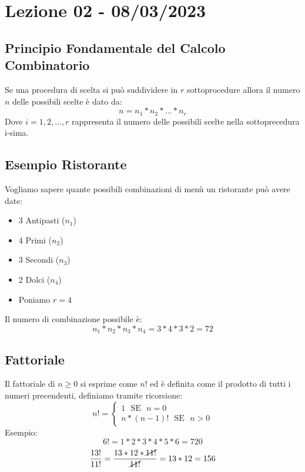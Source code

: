 \section{Lezione 02 - 08/03/2023}

\subsection{Principio Fondamentale del Calcolo Combinatorio}
Se una procedura di scelta si può suddividere in $r$ sottoprocedure allora il numero $n$ delle possibili scelte è dato da:
$$ n = n_1*n_2*...*n_r$$
Dove $i=1,2,...,r$ rappresenta il numero delle possibili scelte nella sottoprecedura i-sima.\\

\subsection{Esempio Ristorante}
Vogliamo sapere quante possibili combinazioni di menù un ristorante può avere date:
\begin{itemize}
\item 3 Antipasti ($n_1$)
\item 4 Primi ($n_2$)
\item 3 Secondi ($n_3$)
\item 2 Dolci ($n_4$)
\item Poniamo $r=4$ 
\end{itemize}
Il numero di combinazione possibile è:
$$ n_1*n_2*n_3*n_4 = 3*4*3*2 = 72$$

\iffalse
\subsubsection{Esempio Cartellini Camicie}
Vogliamo sapere quanti cartellini delle camicie dobbiamo fabbricare avendo i seguenti dati:
4 Taglie, 2 Foggie, 7 Colori.\\
Usando la regola moltiplicativa poniamo $r=3$ avendo tre possibili varianti, $n_1=4$ per le taglie, $n_2=2$ per le foggie, $n_3=7$ per i colori, ora calcoliamo il totale:
$$ n = n_1*n_2*n_3 = 4*2*7 = 56 \:\:\: \textbf{CARTELLINI} $$
\fi

\subsection{Fattoriale}
Il fattoriale di $n \ge 0$ si esprime come $n!$ ed è definita come il prodotto di tutti i numeri precendenti, definiamo tramite ricorsione:
\begin{equation*}
n! = 
\begin{cases}
1 \: \: \: \text{SE} \: \: \: n=0\\
n*(n-1)! \: \: \: \text{SE} \: \: \: n>0
\end{cases}
\end{equation*}
Esempio: 
$$6! = 1*2*3*4*5*6 = 720$$
$$ \frac{13!}{11!} = \frac{13*12*\cancel{11!}}{\cancel{11!}} = 13*12 = 156 $$
\newpage


